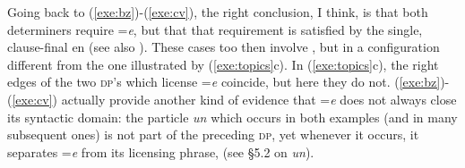 \documentclass[output=paper,
modfonts
]{LSP/langsci}
\begin{document}
 Going back to (\ref{exe:bz})-(\ref{exe:cv}), the right conclusion, I think, is that both determiners require =\emph{e}, but that that 
 requirement is satisfied by the single, clause-final en (see also \citealt{skopeteas2010}). 
 These cases too then involve , but in a configuration 
 different from  the one illustrated by (\ref{exe:topics}c). In (\ref{exe:topics}c), the right edges of the two \textsc{dp}'s which license
 =\emph{e} coincide, but here they do not. (\ref{exe:bz})-(\ref{exe:cv}) actually provide another kind of evidence that  =\emph{e} does not
 always close its syntactic domain: the particle \emph{un} which occurs in both examples (and in many subsequent ones) is not part of the preceding \textsc{dp}, yet
whenever it occurs, it separates =\emph{e} from its licensing phrase, (see \S5.2 on \emph{un}).
\end{document}
